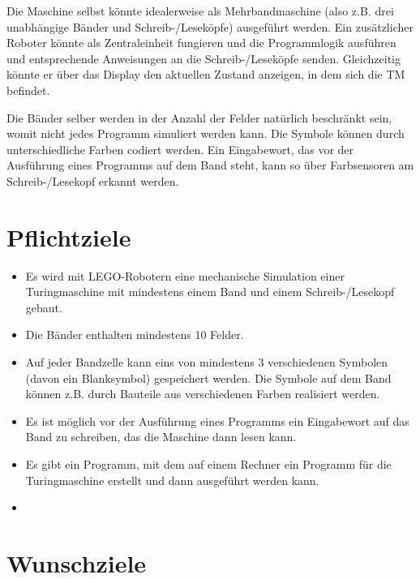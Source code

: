 \documentclass[a4paper,12pt]{article}
\begin{document}
Die Maschine selbst könnte idealerweise als Mehrbandmaschine (also z.B. drei unabhängige Bänder und Schreib-/Leseköpfe) ausgeführt werden. Ein zusätzlicher Roboter könnte als Zentraleinheit fungieren und die Programmlogik ausführen und entsprechende Anweisungen an die Schreib-/Leseköpfe senden. Gleichzeitig könnte er über das Display den aktuellen Zustand anzeigen, in dem sich die TM befindet.

Die Bänder selber werden in der Anzahl der Felder natürlich beschränkt sein, womit nicht jedes Programm simuliert werden kann. Die Symbole können durch unterschiedliche Farben codiert werden. Ein Eingabewort, das vor der Ausführung eines Programms auf dem Band steht, kann so über Farbsensoren am Schreib-/Lesekopf erkannt werden.

\section{Pflichtziele}

\begin{itemize}
\item Es wird mit LEGO-Robotern eine mechanische Simulation einer Turingmaschine mit mindestens einem Band und einem Schreib-/Lesekopf gebaut.
\item Die Bänder enthalten mindestens 10 Felder.
\item Auf jeder Bandzelle kann eins von mindestens 3 verschiedenen Symbolen (davon ein Blanksymbol) gespeichert werden. Die Symbole auf dem Band können z.B. durch Bauteile aus verschiedenen Farben realisiert werden.
\item Es ist möglich vor der Ausführung eines Programms ein Eingabewort auf das Band zu schreiben, das die Maschine dann lesen kann. 
\item Es gibt ein Programm, mit dem auf einem Rechner ein Programm für die Turingmaschine erstellt und dann ausgeführt werden kann.
\item {}
\end{itemize}

\section{Wunschziele}
\end{document}
